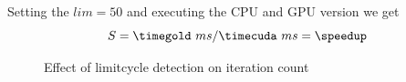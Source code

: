Setting the $lim = 50$ and executing the \gls{CPU} and \gls{GPU} version we get
\fpDiv{\speedup}{\tgold}{\tcuda}
\begin{equation*}\label{eq:speedup0}
	S = \timegold\ ms/\timecuda\ ms = \speedup
\end{equation*}


\begin{figure}[ht]
\centering
{}%
%
%

\caption{Effect of limitcycle detection on iteration count}
\label{fig:limitcycle}
\end{figure}



